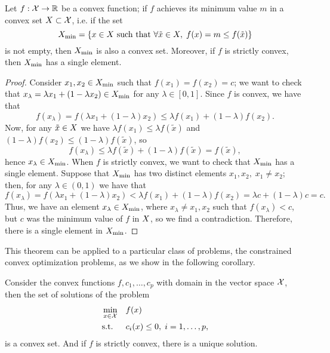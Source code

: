 \begin{theorem}
    Let $f: \mathcal{X} \to \mathbb{R}$ be a convex function; if $f$ achieves its minimum value $m$ in a convex set $X \subset \mathcal{X}$, i.e. if the set 
    $$ X_{\min} = \left\{x \in X \text{ such that }  \forall \tilde{x} \in X, \;  f(x) = m \leq f(\tilde{x})\right\}$$
    is not empty, then $X_{\min}$ is also a convex set. 
    Moreover, if $f$ is strictly convex, then $X_{\min}$ has a single element.
\end{theorem}
\begin{proof}
    Consider $x_1, x_2 \in X_{\min}$ such that $f(x_1) = f(x_2) = c$; we want to check that $x_\lambda = \lambda x_1 + (1 - \lambda x_2) \in X_{\min}$ for any $\lambda \in [0, 1]$.
    Since $f$ is convex, we have that
    \begin{equation}
        \nonumber
        f(x_\lambda) = f(\lambda x_1 + (1 - \lambda) x_2) \leq \lambda f(x_1) + (1 - \lambda) f(x_2) .
    \end{equation}
    Now, for any $\tilde{x} \in X$ we have $\lambda f(x_1) \leq \lambda f(\tilde{x})$ and $(1 - \lambda) f(x_2) \leq (1 - \lambda) f(\tilde{x})$, so 
    $$f(x_\lambda) \leq  \lambda f(\tilde{x}) + (1 - \lambda) f(\tilde{x}) = f(\tilde{x}),$$ hence $x_\lambda \in X_{\min}$.
    When $f$ is strictly convex, we want to check that $X_{\min}$ has a single element. Suppose that $X_{\min}$ has two distinct elements $x_1, x_2, \; x_1 \neq x_2$; then, for any $\lambda \in (0, 1)$ we have that 
    $$ f(x_\lambda) = f(\lambda x_1 + (1 - \lambda) x_2) < \lambda f(x_1) + (1 - \lambda) f(x_2) = \lambda c + (1- \lambda)c = c.$$
    Thus, we have an element $x_\lambda \in X_{\min}$, where $x_\lambda \neq x_1, x_2$ such that $f(x_\lambda) < c$, but $c$ was the minimum value of $f$ in $X$, so we find a contradiction. Therefore, there is a single element in $X_{\min}$.
\end{proof}
This theorem can be applied to a particular class of problems, the constrained convex optimization problems, as we show in the following corollary.
\begin{corollary}
    Consider the convex functions $f, c_1, \ldots, c_p$ with domain in the vector space $\mathcal{X}$, then the set of solutions of the problem
    \begin{equation}\nonumber
        \begin{aligned}
            &\min_{x \in \mathcal{X}} & & f(x) \\
            & \text{s.t.} & & c_i(x) \leq 0,\; i=1, \ldots, p ,  
        \end{aligned}
    \end{equation}
    is a convex set. And if $f$ is strictly convex, there is a unique solution.
\end{corollary}
